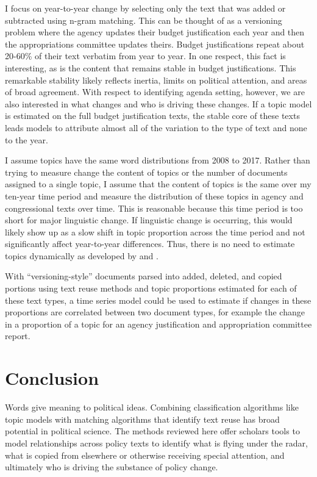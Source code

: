 \documentclass{article}
\begin{document}
I focus on year-to-year change by selecting only the text that was added or subtracted using n-gram matching. This can be thought of as a versioning problem where the agency updates their budget justification each year and then the appropriations committee updates theirs. Budget justifications repeat about 20-60\% of their text verbatim from year to year. In one respect, this fact is interesting, as is the content that remains stable in budget justifications. This remarkable stability likely reflects inertia, limits on political attention, and areas of broad agreement. With respect to identifying agenda setting, however, we are also interested in what changes and who is driving these changes. If a topic model is estimated on the full budget justification texts, the stable core of these texts leads models to attribute almost all of the variation to the type of text and none to the year. 

I assume topics have the same word distributions from 2008 to 2017.  Rather than trying to measure change the content of topics or the number of documents assigned to a single topic, I assume that the content of topics is the same over my ten-year time period and measure the distribution of these topics in agency and congressional texts over time. This is reasonable because this time period is too short for major linguistic change. If linguistic change is occurring, this would likely show up as a slow shift in topic proportion across the time period and not significantly affect year-to-year differences. Thus, there is no need to estimate topics dynamically as developed by \cite{Blei2006} and \cite{Brookhart2015}.

With ``versioning-style'' documents parsed into added, deleted, and copied portions using text reuse methods and topic proportions estimated for each of these text types, a  time series model could be used to estimate if changes in these proportions are correlated between two document types, for example the change in a proportion of a topic for an agency justification and appropriation committee report.


\section{Conclusion}

Words give meaning to political ideas. Combining classification algorithms like topic models with matching algorithms that identify text reuse has broad potential in political science. The methods reviewed here offer scholars tools to model relationships across policy texts to identify what is flying under the radar, what is copied from elsewhere or otherwise receiving special attention, and ultimately who is driving the substance of policy change.






















\pagebreak
\singlespace
\printbibliography
\end{document}

